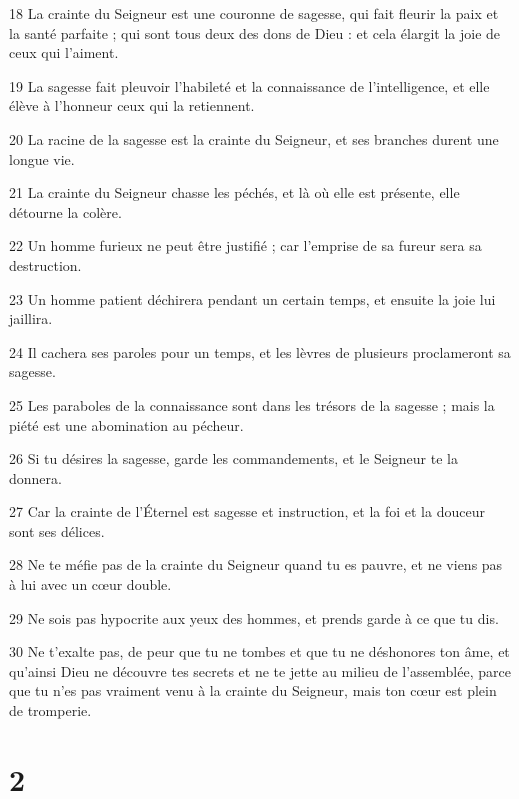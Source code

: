 \par 18 La crainte du Seigneur est une couronne de sagesse, qui fait fleurir la paix et la santé parfaite ; qui sont tous deux des dons de Dieu : et cela élargit la joie de ceux qui l'aiment.
\par 19 La sagesse fait pleuvoir l'habileté et la connaissance de l'intelligence, et elle élève à l'honneur ceux qui la retiennent.
\par 20 La racine de la sagesse est la crainte du Seigneur, et ses branches durent une longue vie.
\par 21 La crainte du Seigneur chasse les péchés, et là où elle est présente, elle détourne la colère.
\par 22 Un homme furieux ne peut être justifié ; car l'emprise de sa fureur sera sa destruction.
\par 23 Un homme patient déchirera pendant un certain temps, et ensuite la joie lui jaillira.
\par 24 Il cachera ses paroles pour un temps, et les lèvres de plusieurs proclameront sa sagesse.
\par 25 Les paraboles de la connaissance sont dans les trésors de la sagesse ; mais la piété est une abomination au pécheur.
\par 26 Si tu désires la sagesse, garde les commandements, et le Seigneur te la donnera.
\par 27 Car la crainte de l'Éternel est sagesse et instruction, et la foi et la douceur sont ses délices.
\par 28 Ne te méfie pas de la crainte du Seigneur quand tu es pauvre, et ne viens pas à lui avec un cœur double.
\par 29 Ne sois pas hypocrite aux yeux des hommes, et prends garde à ce que tu dis.
\par 30 Ne t'exalte pas, de peur que tu ne tombes et que tu ne déshonores ton âme, et qu'ainsi Dieu ne découvre tes secrets et ne te jette au milieu de l'assemblée, parce que tu n'es pas vraiment venu à la crainte du Seigneur, mais ton cœur est plein de tromperie.

\chapter{2}

